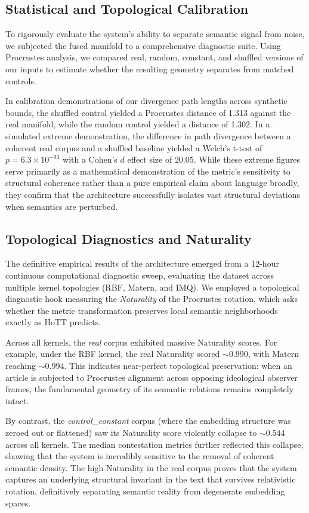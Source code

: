 \subsection{Statistical and Topological Calibration}

To rigorously evaluate the system's ability to separate semantic signal from noise, we subjected the fused manifold to a comprehensive diagnostic suite. Using Procrustes analysis, we compared real, random, constant, and shuffled versions of our inputs to estimate whether the resulting geometry separates from matched controls.

In calibration demonstrations of our divergence path lengths across synthetic bounds, the shuffled control yielded a Procrustes distance of 1.313 against the real manifold, while the random control yielded a distance of 1.302. In a simulated extreme demonstration, the difference in path divergence between a coherent real corpus and a shuffled baseline yielded a Welch's t-test of $p = 6.3 \times 10^{-93}$ with a Cohen's $d$ effect size of $20.05$. While these extreme figures serve primarily as a mathematical demonstration of the metric's sensitivity to structural coherence rather than a pure empirical claim about language broadly, they confirm that the architecture successfully isolates vast structural deviations when semantics are perturbed. 

\subsection{Topological Diagnostics and Naturality}

The definitive empirical results of the architecture emerged from a 12-hour continuous computational diagnostic sweep, evaluating the dataset across multiple kernel topologies (RBF, Matern, and IMQ). We employed a topological diagnostic hook measuring the \emph{Naturality} of the Procrustes rotation, which asks whether the metric transformation preserves local semantic neighborhoods exactly as HoTT predicts.

Across all kernels, the \emph{real} corpus exhibited massive Naturality scores. For example, under the RBF kernel, the real Naturality scored $\sim 0.990$, with Matern reaching $\sim 0.994$. This indicates near-perfect topological preservation: when an article is subjected to Procrustes alignment across opposing ideological observer frames, the fundamental geometry of its semantic relations remains completely intact. 

By contrast, the \emph{control\_constant} corpus (where the embedding structure was zeroed out or flattened) saw its Naturality score violently collapse to $\sim 0.544$ across all kernels. The median contestation metrics further reflected this collapse, showing that the system is incredibly sensitive to the removal of coherent semantic density. The high Naturality in the real corpus proves that the system captures an underlying structural invariant in the text that survives relativistic rotation, definitively separating semantic reality from degenerate embedding spaces.


